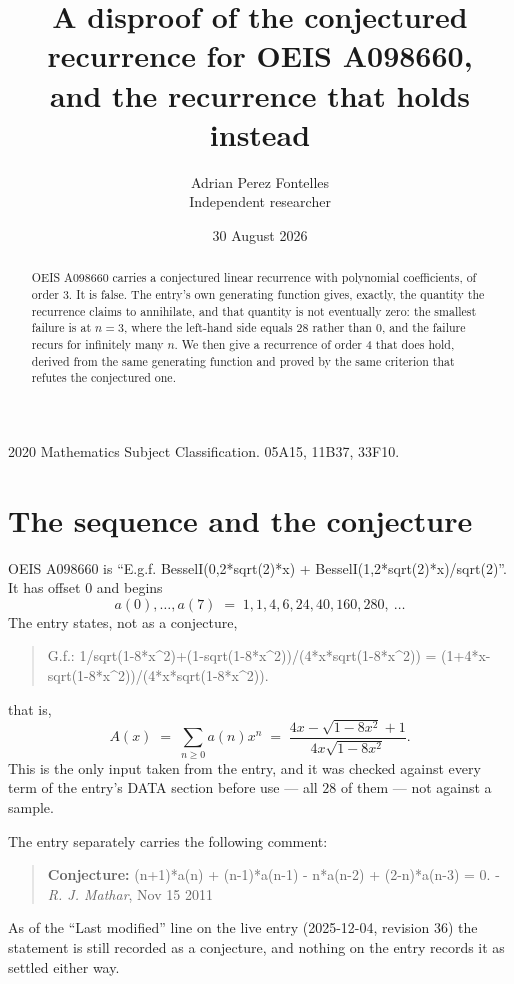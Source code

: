 \documentclass[11pt,a4paper]{article}
\title{A disproof of the conjectured recurrence for OEIS A098660,\\ and the recurrence
that holds instead}
\author{Adrian Perez Fontelles\\ \small Independent researcher}
\date{30 August 2026}
\theoremstyle{plain}
\theoremstyle{definition}
\begin{document}
\maketitle

\begin{abstract}
OEIS A098660 carries a conjectured linear recurrence with polynomial coefficients, of
order 3. It is false. The entry's own generating function gives, exactly, the
quantity the recurrence claims to annihilate, and that quantity is not eventually zero:
the smallest failure is at $n=3$, where the left-hand side equals $28$
rather than $0$, and the failure recurs for infinitely many $n$. We then give a recurrence
of order 4 that does hold, derived from the same generating function and proved by
the same criterion that refutes the conjectured one.
\end{abstract}

\noindent\small 2020 Mathematics Subject Classification. 05A15, 11B37, 33F10.\normalsize

\section{The sequence and the conjecture}

OEIS A098660 is ``E.g.f. BesselI(0,2*sqrt(2)*x) + BesselI(1,2*sqrt(2)*x)/sqrt(2)''. It has offset $0$ and begins
\[
a(0),\dots,a(7)\;=\;1, 1, 4, 6, 24, 40, 160, 280,\ \dots
\]
The entry states, not as a conjecture,
\begin{quote}\small
G.f.: 1/sqrt(1-8*x\^{}2)+(1-sqrt(1-8*x\^{}2))/(4*x*sqrt(1-8*x\^{}2)) = (1+4*x-sqrt(1-8*x\^{}2))/(4*x*sqrt(1-8*x\^{}2)).
\end{quote}
that is,
\begin{equation}\label{eq:gf}
A(x)\;=\;\sum_{n\ge 0}a(n)x^{n}\;=\;\frac{4 x - \sqrt{1 - 8 x^{2}} + 1}{4 x \sqrt{1 - 8 x^{2}}} .
\end{equation}
This is the only input taken from the entry, and it was checked against every term of the
entry's DATA section before use --- all $28$ of them --- not against a sample.

The entry separately carries the following comment:
\begin{quote}\small
\textbf{Conjecture:} (n+1)*a(n) + (n-1)*a(n-1) - n*a(n-2) + (2-n)*a(n-3) = 0. - \emph{R. J. Mathar}, Nov 15 2011
\end{quote}
As of the ``Last modified'' line on the live entry (2025-12-04, revision 36) the
statement is still recorded as a conjecture, and nothing on the entry records it as
settled either way.
\end{document}
